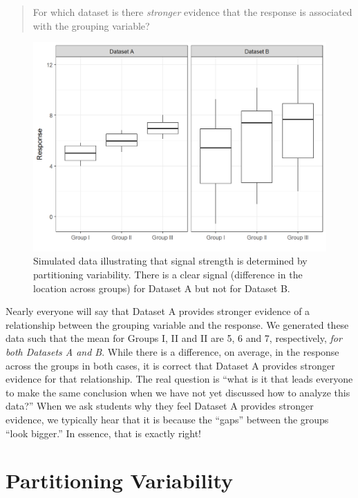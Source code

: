 \documentclass[]{book}
\theoremstyle{definition}
\theoremstyle{definition}
\theoremstyle{remark}
\begin{document}
\begin{quote}
For which dataset is there \emph{stronger} evidence that the response is
associated with the grouping variable?
\end{quote}

\begin{figure}

{\centering \includegraphics[width=0.8\linewidth]{./Images/anovateststat-boxplots-1} 

}

\caption{Simulated data illustrating that signal strength is determined by partitioning variability. There is a clear signal (difference in the location across groups) for Dataset A but not for Dataset B.}\label{fig:anovateststat-boxplots}
\end{figure}

Nearly everyone will say that Dataset A provides stronger evidence of a
relationship between the grouping variable and the response. We
generated these data such that the mean for Groups I, II and II are 5, 6
and 7, respectively, \emph{for both Datasets A and B}. While there is a
difference, on average, in the response across the groups in both cases,
it is correct that Dataset A provides stronger evidence for that
relationship. The real question is ``what is it that leads everyone to
make the same conclusion when we have not yet discussed how to analyze
this data?'' When we ask students why they feel Dataset A provides
stronger evidence, we typically hear that it is because the ``gaps''
between the groups ``look bigger.'' In essence, that is exactly right!

\section{Partitioning Variability}\label{partitioning-variability}
\end{document}
